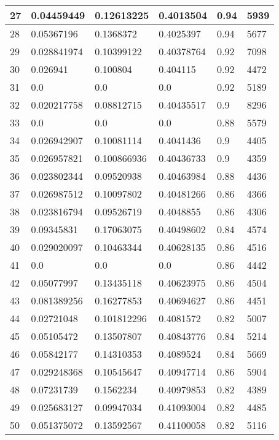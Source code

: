 \begin{longtable}{|l|l|l|l|l|l|}
27 & 0.04459449 & 0.12613225 & 0.4013504 & 0.94 & 5939 \\ \hline 
28 & 0.05367196 & 0.1368372 & 0.4025397 & 0.94 & 5677 \\ \hline 
29 & 0.028841974 & 0.10399122 & 0.40378764 & 0.92 & 7098 \\ \hline 
30 & 0.026941 & 0.100804 & 0.404115 & 0.92 & 4472 \\ \hline 
31 & 0.0 & 0.0 & 0.0 & 0.92 & 5189 \\ \hline 
32 & 0.020217758 & 0.08812715 & 0.40435517 & 0.9 & 8296 \\ \hline 
33 & 0.0 & 0.0 & 0.0 & 0.88 & 5579 \\ \hline 
34 & 0.026942907 & 0.10081114 & 0.4041436 & 0.9 & 4405 \\ \hline 
35 & 0.026957821 & 0.100866936 & 0.40436733 & 0.9 & 4359 \\ \hline 
36 & 0.023802344 & 0.09520938 & 0.40463984 & 0.88 & 4436 \\ \hline 
37 & 0.026987512 & 0.10097802 & 0.40481266 & 0.86 & 4366 \\ \hline 
38 & 0.023816794 & 0.09526719 & 0.4048855 & 0.86 & 4306 \\ \hline 
39 & 0.09345831 & 0.17063075 & 0.40498602 & 0.84 & 4574 \\ \hline 
40 & 0.029020097 & 0.10463344 & 0.40628135 & 0.86 & 4516 \\ \hline 
41 & 0.0 & 0.0 & 0.0 & 0.86 & 4442 \\ \hline 
42 & 0.05077997 & 0.13435118 & 0.40623975 & 0.86 & 4504 \\ \hline 
43 & 0.081389256 & 0.16277853 & 0.40694627 & 0.86 & 4451 \\ \hline 
44 & 0.02721048 & 0.101812296 & 0.4081572 & 0.82 & 5007 \\ \hline 
45 & 0.05105472 & 0.13507807 & 0.40843776 & 0.84 & 5214 \\ \hline 
46 & 0.05842177 & 0.14310353 & 0.4089524 & 0.84 & 5669 \\ \hline 
47 & 0.029248368 & 0.10545647 & 0.40947714 & 0.86 & 5904 \\ \hline 
48 & 0.07231739 & 0.1562234 & 0.40979853 & 0.82 & 4389 \\ \hline 
49 & 0.025683127 & 0.09947034 & 0.41093004 & 0.82 & 4485 \\ \hline 
50 & 0.051375072 & 0.13592567 & 0.41100058 & 0.82 & 5116 \\ \hline 
\end{longtable}